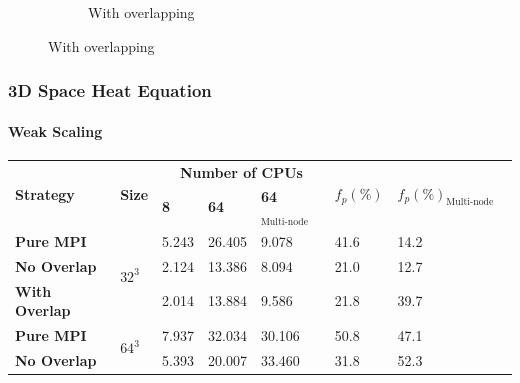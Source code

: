 \begin{frame}
\begin{figure}
\begin{subfigure}{0.42\textwidth}
      \caption{With overlapping}
      \label{FIG:Benchmark:FIG_Benchmark_hybrid_1_multi_nodes_3D}
    \end{subfigure}
    \label{FIG:Benchmark:Hybrid_Four_Node_3D}
  \end{figure}

  
\end{frame}



\begin{frame}
  \frametitle{3D Space Heat Equation}
  \framesubtitle{Weak Scaling}


      \begin{center}
        \footnotesize %
        \begin{tabular}{p{2.5cm} p{1cm} p{1.5cm} p{1.5cm} p{1.5cm} p{1.5cm} p{1cm} p{1cm}}
          \toprule
          \multirow{2}{*}{\bfseries Strategy} & \multirow{2}{*}{\bfseries Size} & \multicolumn{3}{c}{\bfseries  Number of CPUs}    & \multirow{2}{*}{\bfseries $f_p(\%)$}  & \multirow{2}{*}{\bfseries $f_p(\%)_{\text{Multi-node}}$}\\
                        &                      & \bfseries 8     & \bfseries 64        & \bfseries 64$_{\text{Multi-node}}$   &  &  &         \\
          \midrule
          \bfseries Pure MPI      & \multirow{3}{*}{$32^3$}       & 5.243  & 26.405              &  9.078                     & 41.6 & 14.2 \\
          \bfseries No Overlap    &                               & 2.124  & 13.386              &  8.094                     & 21.0 &  12.7\\
          \bfseries With Overlap  &                               & 2.014  & 13.884              &  9.586                     & 21.8 & 39.7 \\
          \midrule
          \bfseries Pure MPI      & \multirow{3}{*}{$64^3$}       & 7.937  & 32.034              &  30.106                    & 50.8 & 47.1 \\
          \bfseries No Overlap    &                               & 5.393  & 20.007              &  33.460                    & 31.8 & 52.3 \\

\end{tabular}
\end{center}
\end{frame}
